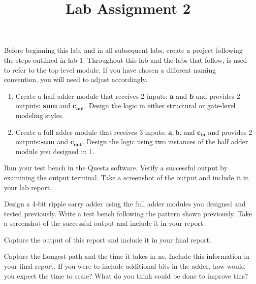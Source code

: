 \documentclass[12pt]{labmanual}
\title{Lab Assignment 2 }
\author{}
\date{}
\begin{document}
\maketitle
\makeheaders
\clearpage
\tableofcontents
\clearpage
\begin{important}
Before beginning this lab, and in all subsequent labs, create a project following the steps outlined in lab 1. Throughout this lab and the labs that follow,  is used to refer to the top-level module. If you have chosen a different naming convention, you will need to adjust accordingly.
\end{important}
\clearpage
\begin{questionssection}
\begin{question}
\begin{enumerate}
    \item  Create a half adder module that receives 2 inputs: $\mathbf{a}$ and $\mathbf{b}$ and provides 2 outputs: \textbf{sum} and $\textbf{c}_\textbf{out}$. Design the logic in either structural or gate-level modeling styles.
    \item Create a full adder module that receives 3 inputs: $\mathbf{a},\mathbf{b}$, and $\textbf{c}_\textbf{in}$ and provides 2 outputs:\hspace{1em}\textbf{sum} and $\textbf{c}_\textbf{out}$. Design the logic using two instances of the half adder module you designed in 1.
\end{enumerate}
\end{question}
\begin{question}
    Run your test bench in the Questa software. Verify a successful output by examining the output terminal. Take a screenshot of the output and include it in your lab report.
\end{question}
\begin{question}
    Design a 4-bit ripple carry adder using the full adder modules you designed and tested previously. Write a test bench following the pattern shown previously. Take a screenshot of the successful output and include it in your report.
\end{question}
\begin{question}
    Capture the output of this report and include it in your final report.
\end{question}
\begin{question}
    Capture the Longest path and the time it takes in ns. Include this information in your final report. If you were to include additional bits in the adder, how would you expect the time to scale? What do you think could be done to improve this?

\end{question}
\end{questionssection}
\end{document}
